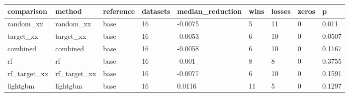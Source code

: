 \begin{tabular}{lllllllll}
\toprule
comparison & method & reference & datasets & median\_reduction & wins & losses & zeros & p \\
\midrule
random\_xx & random\_xx & base & 16 & -0.0075 & 5 & 11 & 0 & 0.011 \\
target\_xx & target\_xx & base & 16 & -0.0053 & 6 & 10 & 0 & 0.0507 \\
combined & combined & base & 16 & -0.0058 & 6 & 10 & 0 & 0.1167 \\
rf & rf & base & 16 & -0.001 & 8 & 8 & 0 & 0.3755 \\
rf\_target\_xx & rf\_target\_xx & base & 16 & -0.0077 & 6 & 10 & 0 & 0.1591 \\
lightgbm & lightgbm & base & 16 & 0.0116 & 11 & 5 & 0 & 0.1297 \\
\bottomrule
\end{tabular}
